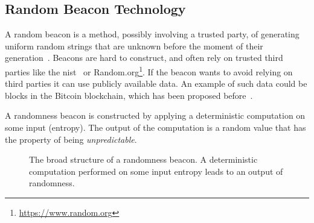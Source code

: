 \subsection{Random Beacon Technology}
A random beacon is a method, possibly involving a trusted party, of generating uniform random strings that are unknown before the moment of their generation~\cite{andrychowicz2014distributed}.
Beacons are hard to construct, and often rely on trusted third parties like the \acrfull{nist}~\cite{nistbeacon} or Random.org\footnote{\url{https://www.random.org}}.
If the beacon wants to avoid relying on third parties it can use publicly available data.
An example of such data could be blocks in the Bitcoin blockchain, which has been proposed before~\cite{bonneau2015bitcoin}.

A randomness beacon is constructed by applying a deterministic computation on some input (entropy). The output of the computation is a random value that has the property of being \emph{unpredictable}.

\begin{figure}[htb]
    \centering
    \caption{The broad structure of a randomness beacon. A deterministic computation performed on some input entropy leads to an output of randomness.}
    \label{fig:beacon}
\end{figure}
